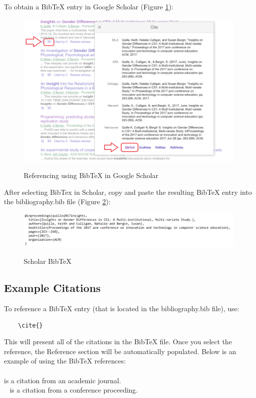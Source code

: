 \documentclass[12pt]{article}
\begin{document}
To obtain a BibTeX entry in Google Scholar (Figure \ref{lab:scholarBibTeX}):
\begin{figure}[ht!]
 	\centering
 	\caption{Referencing using BibTeX in Google Scholar}
 	\includegraphics[width=0.7\linewidth]{images/scholar.png}
 	\label{lab:scholarBibTeX}
 \end{figure}
 
 After selecting BibTex in Scholar, copy and paste the resulting BibTeX entry into the bibliography.bib file (Figure \ref{lab:BibTeX}):
 
 \begin{figure}[ht!]
 	\centering
 	\caption{Scholar BibTeX}
 	\includegraphics[width=1\linewidth]{images/bibtex.png}
 	\label{lab:BibTeX}
 \end{figure}




\subsection{Example Citations}
To reference a BibTeX entry (that is located in the bibliography.bib file), use:

\begin{verbatim}
    \cite{}
\end{verbatim}

This will present all of the citations in the BibTeX file. Once you select the reference, the Reference section will be automatically populated. Below is an example of using the BibTeX references:\\\\


\cite{Quille2019} is a citation from an academic journal.\\\
\cite{Quille:Gender} is a citation from a conference proceeding.
\end{document}
